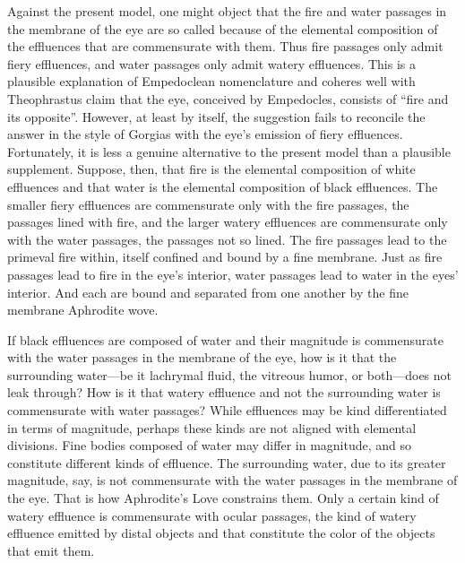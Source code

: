 Against the present model, one might object that the fire and water passages in the membrane of the eye are so called because of the elemental composition of the effluences that are commensurate with them. Thus fire passages only admit fiery effluences, and water passages only admit watery effluences. This is a plausible explanation of Empedoclean nomenclature and coheres well with Theophrastus claim that the eye, conceived by Empedocles, consists of ``fire and its opposite''. However, at least by itself, the suggestion fails to reconcile the answer in the style of Gorgias with the eye's emission of fiery effluences. Fortunately, it is less a genuine alternative to the present model than a plausible supplement. Suppose, then, that fire is the elemental composition of white effluences and that water is the elemental composition of black effluences. The smaller fiery effluences are commensurate only with the fire passages, the passages lined with fire, and the larger watery effluences are commensurate only with the water passages, the passages not so lined. The fire passages lead to the primeval fire within, itself confined and bound by a fine membrane. Just as fire passages lead to fire in the eye's interior, water passages lead to water in the eyes' interior. And each are bound and separated from one another by the fine membrane Aphrodite wove.

If black effluences are composed of water and their magnitude is commensurate with the water passages in the membrane of the eye, how is it that the surrounding water---be it lachrymal fluid, the vitreous humor, or both---does not leak through? How is it that watery effluence and not the surrounding water is commensurate with water passages? While effluences may be kind differentiated in terms of magnitude, perhaps these kinds are not aligned with elemental divisions. Fine bodies composed of water may differ in magnitude, and so constitute different kinds of effluence. The surrounding water, due to its greater magnitude, say, is not commensurate with the water passages in the membrane of the eye. That is how Aphrodite's Love constrains them. Only a certain kind of watery effluence is commensurate with ocular passages, the kind of watery effluence emitted by distal objects and that constitute the color of the objects that emit them. 

